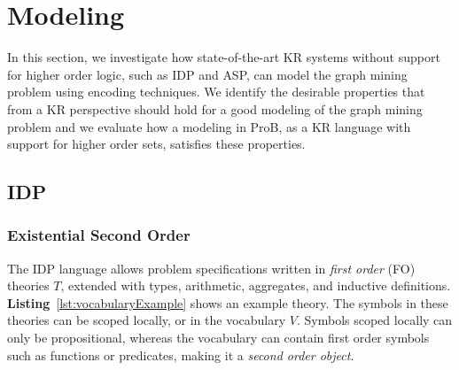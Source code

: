 \section{Modeling}\label{sec:modeling}
In this section, we investigate how state-of-the-art KR systems without support for higher order logic, such as IDP and ASP, can model the graph mining problem 
using encoding techniques.
We identify the desirable properties that from a KR perspective should hold for a good modeling of the graph mining problem and we evaluate how a modeling in ProB, as a KR language with support for higher order sets, satisfies these properties.

\subsection{IDP}
\subsubsection{Existential Second Order}
The IDP language allows problem specifications written in \emph{first order} (FO) theories $T$, extended with types, arithmetic, aggregates, and inductive definitions.
\textbf{Listing}~\ref{lst:vocabularyExample} shows an example theory.
The symbols in these theories can be scoped locally, or in the vocabulary $V$.
Symbols scoped locally can only be propositional, whereas the vocabulary can contain first order symbols such as functions or predicates, making it a \emph{second order object}.

